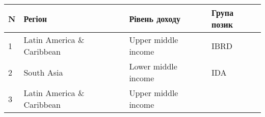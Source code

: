 \documentclass[
]{article}
\begin{document}
\begin{longtable}[]{@{}llll@{}}
\toprule
\begin{minipage}[b]{0.06\columnwidth}\raggedright
N\strut
\end{minipage} & \begin{minipage}[b]{0.17\columnwidth}\raggedright
Регіон\strut
\end{minipage} & \begin{minipage}[b]{0.11\columnwidth}\raggedright
Рівень доходу\strut
\end{minipage} & \begin{minipage}[b]{0.16\columnwidth}\raggedright
Група позик\strut
\end{minipage}\tabularnewline
\midrule
\endhead
\begin{minipage}[t]{0.06\columnwidth}\raggedright
1\strut
\end{minipage} & \begin{minipage}[t]{0.17\columnwidth}\raggedright
Latin America \& Caribbean\strut
\end{minipage} & \begin{minipage}[t]{0.11\columnwidth}\raggedright
Upper middle income\strut
\end{minipage} & \begin{minipage}[t]{0.16\columnwidth}\raggedright
IBRD\strut
\end{minipage}\tabularnewline
\begin{minipage}[t]{0.06\columnwidth}\raggedright
2\strut
\end{minipage} & \begin{minipage}[t]{0.17\columnwidth}\raggedright
South Asia\strut
\end{minipage} & \begin{minipage}[t]{0.11\columnwidth}\raggedright
Lower middle income\strut
\end{minipage} & \begin{minipage}[t]{0.16\columnwidth}\raggedright
IDA\strut
\end{minipage}\tabularnewline
\begin{minipage}[t]{0.06\columnwidth}\raggedright
3\strut
\end{minipage} & \begin{minipage}[t]{0.17\columnwidth}\raggedright
Latin America \& Caribbean\strut
\end{minipage} & \begin{minipage}[t]{0.11\columnwidth}\raggedright
Upper middle income\strut
\end{minipage} & \begin{minipage}[t]{0.16\columnwidth}\raggedright

\end{minipage}
\end{longtable}
\end{document}
